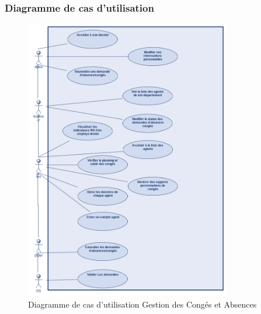 \subsubsection{Diagramme de cas d'utilisation}
\begin{figure}[H]
    \centering
    \includegraphics[width=0.8\textwidth]{images/diagrammes/use-cases/conges.png}
    \caption{Diagramme de cas d'utilisation Gestion des Congés et Absences}
    \label{fig:use_case_gestion_conges}

\end{figure}
